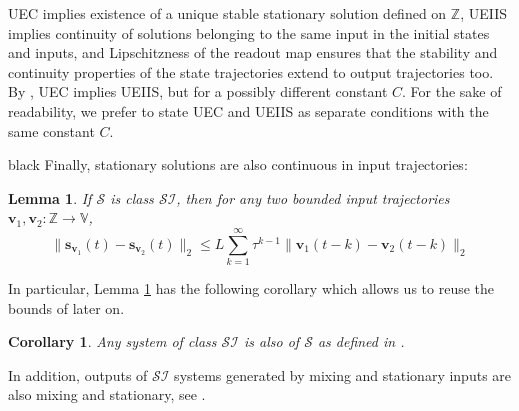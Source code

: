 \documentclass{ifacconf}
\def\vs{{\bm{s}}}
\def\vv{{\bm{v}}}
\def\sV{{\mathbb{V}}}
\def\sZ{{\mathbb{Z}}}
\newtheorem{lemma}{Lemma}[section]
\newtheorem{corollary}{Corollary}[section]
\newtheorem{Remark}{Remark}[section]
\newcommand{\class}{\(\mathcal{SI}\)}
\newcommand{\classOld}{\(\mathcal{S}\)}
\begin{document}
%
UEC implies existence of a unique stable stationary solution defined on $\mathbb{Z}$, UEIIS implies continuity of solutions belonging to the same input in the initial states and inputs,  
and Lipschitzness of the readout map ensures that the stability and continuity properties of the state trajectories extend to output trajectories too.
By \cite[Theorem 2]{TanTAC}, UEC implies UEIIS, but for a possibly different constant $C$. For the sake of readability, we prefer to state UEC and UEIIS as separate conditions with the same constant $C$. 
\begin{color}{black}
Finally, stationary solutions are also continuous in input trajectories:
\begin{lemma}
\label{lemma:oldNewS}
    If $\mathcal{S}$ is class \class{}, then
    for any two bounded input trajectories $\vv_1,\vv_2:\sZ\to \sV$,\begin{equation}
    \label{def:classDef:mem}
        \|\vs_{\vv_1}(t)-\vs_{\vv_2}(t)\|_2\leq L\sum_{k=1}^\infty \tau^{k-1}\|\vv_1(t-k)-\vv_2(t-k)\|_2
    \end{equation}
\end{lemma}
In particular, Lemma \ref{lemma:oldNewS} has the following
corollary which allows us to
reuse the bounds of \cite{eringis2023pacbayesRNN} later on.
\begin{corollary}
  Any system of class \class{} is also of \classOld{} as defined in \cite{eringis2023pacbayesRNN}.
\end{corollary}
\end{color}
In addition, outputs of \class{} systems generated by mixing and stationary inputs are also mixing and stationary, 
see \cite[Lemma A4.1]{eringis2023pacbayesRNN_OLD}.
\end{document}
